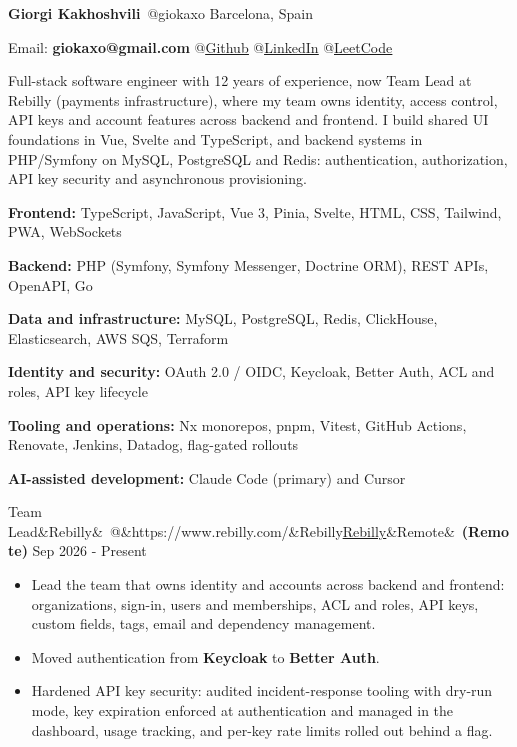 \documentclass[10pt]{article}
\makeatletter
\newcommand{\weblink}[2]{\href{#1}{\textcolor{linkblue}{\underline{#2}}}}
\newcommand{\resumesection}[1]{\vspace{9pt}{\small\bfseries\textls{\MakeUppercase{#1}}}\par\vspace{3pt}}
\newcommand{\role}[5]{%
  \vspace{5pt}\par\noindent
  {\normalsize #1\ifx&#2&\else\ @\ifx&#3&#2\else\weblink{#3}{#2}\fi\fi\ifx&#4&\else\ \textbf{(#4)}\fi}%
  \hfill{\footnotesize #5}\par\nopagebreak\vspace{1pt}}
\makeatother
\begin{document}
\small

{\Large\bfseries Giorgi Kakhoshvili}\ {\large @giokaxo} \hfill Barcelona, Spain\par
\vspace{3pt}
Email: \textbf{giokaxo@gmail.com} \hfill {\footnotesize
@\weblink{https://github.com/giokaxo}{Github}
@\weblink{https://www.linkedin.com/in/giorgi-kakhoshvili/}{LinkedIn}
@\weblink{https://leetcode.com/u/giokaxo/}{LeetCode}}\par

\resumesection{Summary}
Full-stack software engineer with 12 years of experience, now Team Lead at Rebilly (payments infrastructure), where my team owns identity, access control, API keys and account features across backend and frontend. I build shared UI foundations in Vue, Svelte and TypeScript, and backend systems in PHP/Symfony on MySQL, PostgreSQL and Redis: authentication, authorization, API key security and asynchronous provisioning.\par

\resumesection{Skills}
\textbf{Frontend:} TypeScript, JavaScript, Vue 3, Pinia, Svelte, HTML, CSS, Tailwind, PWA, WebSockets\par
\textbf{Backend:} PHP (Symfony, Symfony Messenger, Doctrine ORM), REST APIs, OpenAPI, Go\par
\textbf{Data and infrastructure:} MySQL, PostgreSQL, Redis, ClickHouse, Elasticsearch, AWS SQS, Terraform\par
\textbf{Identity and security:} OAuth 2.0 / OIDC, Keycloak, Better Auth, ACL and roles, API key lifecycle\par
\textbf{Tooling and operations:} Nx monorepos, pnpm, Vitest, GitHub Actions, Renovate, Jenkins, Datadog, flag-gated rollouts\par
\textbf{AI-assisted development:} Claude Code (primary) and Cursor\par

\resumesection{Experience}

\role{Team Lead}{Rebilly}{https://www.rebilly.com/}{Remote}{Sep 2026 - Present}
\begin{itemize}
  \item Lead the team that owns identity and accounts across backend and frontend: organizations, sign-in, users and memberships, ACL and roles, API keys, custom fields, tags, email and dependency management.
  \item Moved authentication from \textbf{Keycloak} to \textbf{Better Auth}.
  \item Hardened API key security: audited incident-response tooling with dry-run mode, key expiration enforced at authentication and managed in the dashboard, usage tracking, and per-key rate limits rolled out behind a flag.
\end{itemize}
\end{document}
